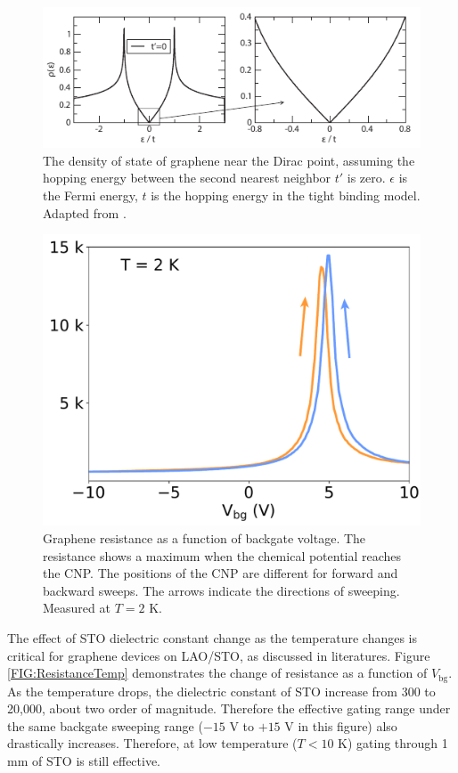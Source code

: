 \documentclass[pdflatex, sectionletters, 12pt]{pittetd}    %
\begin{document}
\begin{figure}[h!]
	\centering
	\includegraphics[width=.9\textwidth]{Drawing/DOS.pdf}
	\caption{The density of state of graphene near the Dirac point, assuming the hopping energy between the second nearest neighbor $t'$ is zero. $\epsilon$ is the Fermi energy, $t$ is the hopping energy in the tight binding model. Adapted from \cite{neto2009electronic}.}
	\label{FIG:DOS}
\end{figure}

\begin{figure}[h!]
	\centering
	\includegraphics[width=.5\textwidth]{Drawing/DiracPeak.pdf}
	\caption{Graphene resistance as a function of backgate voltage. The resistance shows a maximum when the chemical potential reaches the CNP. The positions of the CNP are different for forward and backward sweeps. The arrows indicate the directions of sweeping. Measured at $T = 2$ K.}
	\label{FIG:DiracPeak}
\end{figure}

The effect of STO dielectric constant change as the temperature changes is critical for graphene devices on LAO/STO, as discussed in literatures\cite{couto2011transport}. Figure \ref{FIG:ResistanceTemp} demonstrates the change of resistance as a function of $V_\mathrm{bg}$. As the temperature drops, the dielectric constant of STO increase from 300 to 20,000, about two order of magnitude. Therefore the effective gating range under the same backgate sweeping range ($-15$ V to $+15$ V in this figure) also drastically increases. Therefore, at low temperature ($T < 10$ K) gating through 1 mm of STO is still effective.
\end{document}
